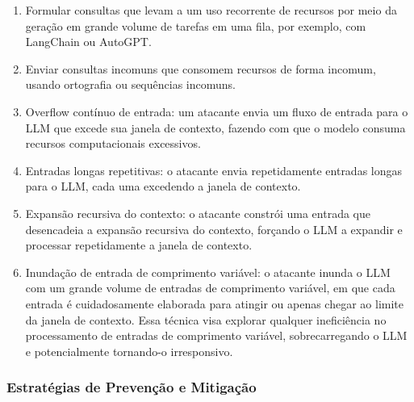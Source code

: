 \documentclass[
]{article}
\providecommand{\tightlist}{%
  \setlength{\itemsep}{0pt}\setlength{\parskip}{0pt}}
\begin{document}
\begin{enumerate}
\def\labelenumi{\arabic{enumi}.}
\tightlist
\item
  Formular consultas que levam a um uso recorrente de recursos por meio
  da geração em grande volume de tarefas em uma fila, por exemplo, com
  LangChain ou AutoGPT.
\item
  Enviar consultas incomuns que consomem recursos de forma incomum,
  usando ortografia ou sequências incomuns.
\item
  Overflow contínuo de entrada: um atacante envia um fluxo de entrada
  para o LLM que excede sua janela de contexto, fazendo com que o modelo
  consuma recursos computacionais excessivos.
\item
  Entradas longas repetitivas: o atacante envia repetidamente entradas
  longas para o LLM, cada uma excedendo a janela de contexto.
\item
  Expansão recursiva do contexto: o atacante constrói uma entrada que
  desencadeia a expansão recursiva do contexto, forçando o LLM a
  expandir e processar repetidamente a janela de contexto.
\item
  Inundação de entrada de comprimento variável: o atacante inunda o LLM
  com um grande volume de entradas de comprimento variável, em que cada
  entrada é cuidadosamente elaborada para atingir ou apenas chegar ao
  limite da janela de contexto. Essa técnica visa explorar qualquer
  ineficiência no processamento de entradas de comprimento variável,
  sobrecarregando o LLM e potencialmente tornando-o irresponsivo.
\end{enumerate}

\subsubsection{Estratégias de Prevenção e
Mitigação}\label{estratuxe9gias-de-prevenuxe7uxe3o-e-mitigauxe7uxe3o}
\end{document}
